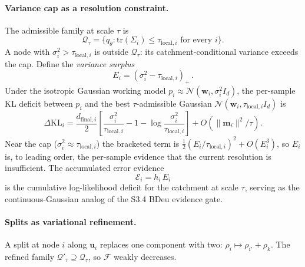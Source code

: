 \documentclass[11pt]{article}
\begin{document}
\paragraph{Variance cap as a resolution constraint.}
The admissible family at scale $\tau$ is
\[
\mathcal Q_\tau
=\bigl\{q_\theta:\mathrm{tr}(\Sigma_i)\le\tau_{\mathrm{local},i}\text{ for every }i\bigr\}.
\]
A node with $\sigma_i^2>\tau_{\mathrm{local},i}$ is outside $\mathcal Q_\tau$: its catchment-conditional variance exceeds the cap. Define the \emph{variance surplus}
\[
E_i=(\sigma_i^2-\tau_{\mathrm{local},i})_+\,.
\]
Under the isotropic Gaussian working model $p_i\approx\mathcal N(\mathbf w_i,\sigma_i^2 I_d)$, the per-sample KL deficit between $p_i$ and the best $\tau$-admissible Gaussian $\mathcal N(\mathbf w_i,\tau_{\mathrm{local},i}I_d)$ is
\[
\Delta\mathrm{KL}_i
=\frac{d_{\mathrm{final},i}}{2}
\!\left[\frac{\sigma_i^2}{\tau_{\mathrm{local},i}}
-1
-\log\frac{\sigma_i^2}{\tau_{\mathrm{local},i}}\right]
+O(\|\mathbf m_i\|^2/\tau).
\]
Near the cap ($\sigma_i^2\approx\tau_{\mathrm{local},i}$) the bracketed term is $\tfrac{1}{2}(E_i/\tau_{\mathrm{local},i})^2+O(E_i^3)$, so $E_i$ is, to leading order, the per-sample evidence that the current resolution is insufficient. The accumulated error evidence
\[
\mathcal E_i=h_i\,E_i
\]
is the cumulative log-likelihood deficit for the catchment at scale $\tau$, serving as the continuous-Gaussian analog of the S3.4 BDeu evidence gate.

\paragraph{Splits as variational refinement.}
A split at node $i$ along $\mathbf u_i$ replaces one component with two: $\rho_i\mapsto\rho_{i'}+\rho_k$. The refined family $\mathcal Q'_\tau\supseteq\mathcal Q_\tau$, so $\mathcal F$ weakly decreases.
\end{document}
